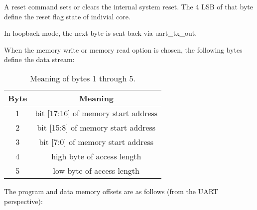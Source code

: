 A reset command sets or clears the internal system reset. The 4 LSB of that byte define the reset flag state of indivial core.

In loopback mode, the next byte is sent back via uart\_tx\_out.

When the memory write or memory read option is chosen, the following bytes define the data stream:

\begin{table}[h]
	{
		\begin{small}
			\begin{center}
				\begin{tabular}{c c}
					\hline
					\multicolumn{1}{|c|}{Byte} &
					\multicolumn{1}{|c|}{Meaning} \\
					\hline
					\multicolumn{1}{|c|}{1} &
					\multicolumn{1}{|c|}{bit [17:16] of memory start address} \\
					\hline
					\multicolumn{1}{|c|}{2} &
					\multicolumn{1}{|c|}{bit [15:8] of memory start address} \\
					\hline
					\multicolumn{1}{|c|}{3} &
					\multicolumn{1}{|c|}{bit [7:0]  of memory start address} \\
					\hline
					\multicolumn{1}{|c|}{4} &
					\multicolumn{1}{|c|}{high byte of access length} \\
					\hline
					\multicolumn{1}{|c|}{5} &
					\multicolumn{1}{|c|}{low byte of access length} \\
					\hline
				\end{tabular}
			\end{center}
		\end{small}
	}
	\caption{Meaning of bytes 1 through 5.}
	\label{uart_byte_1_5}
\end{table}

The program and data memory offsets are as follows (from the UART perspective):


